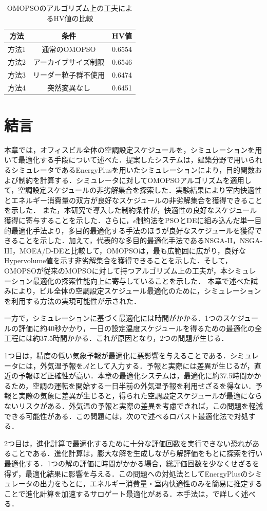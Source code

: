\begin{table}[ht]
  {\small
    \begin{center}
      \caption{OMOPSOのアルゴリズム上の工夫によるHV値の比較}
      \label{tab::sim_result_omopso_hv}
      \begin{tabular}{c|c|c}
        \hline
        方法  & 条件                 & HV値   \\
        \hline \hline
        方法1 & 通常のOMOPSO         & 0.6554 \\
        方法2 & アーカイブサイズ制限 & 0.6546 \\
        方法3 & リーダー粒子群不使用 & 0.6474 \\
        方法4 & 突然変異なし         & 0.6451 \\
        \hline
      \end{tabular}
    \end{center}
  }
\end{table}


\section{結言}
本章では，オフィスビル全体の空調設定スケジュールを，シミュレーションを用いて最適化する手段について述べた．提案したシステムは，建築分野で用いられるシミュレータであるEnergyPlusを用いたシミュレーションにより，目的関数および制約を計算する．シミュレータに対してOMOPSOアルゴリズムを適用して，空調設定スケジュールの非劣解集合を探索した．実験結果により室内快適性とエネルギー消費量の双方が良好なスケジュールの非劣解集合を獲得できることを示した．
また，本研究で導入した制約条件が，快適性の良好なスケジュール獲得に寄与することを示した．さらに，$\epsilon$制約法をPSOとDEに組み込んだ単一目的最適化手法より，多目的最適化する手法のほうが良好なスケジュールを獲得できることを示した．加えて，代表的な多目的最適化手法であるNSGA-II，NSGA-III，MOEA/D-DEと比較して，OMOPSOは，最も広範囲に広がり，良好なHypervolume値を示す非劣解集合を獲得できることを示した．そして，OMOPSOが従来のMOPSOに対して持つアルゴリズム上の工夫が，本シミュレーション最適化の探索性能向上に寄与していることを示した．
本章で述べた試みにより，ビル全体の空調設定スケジュール最適化のために，シミュレーションを利用する方法の実現可能性が示された．

一方で，シミュレーションに基づく最適化には時間がかかる．1つのスケジュールの評価に約40秒かかり，一日の設定温度スケジュールを得るための最適化の全工程には約37.5時間かかる．これが原因となり，2つの問題が生じる．

1つ目は，精度の低い気象予報が最適化に悪影響を与えることである．シミュレータには，外気温予報を$\mathcal{A}$として入力する．予報と実際には差異が生じるが，直近の予報ほど正確性が高い\cite{JMA19}．本章の最適化システムは，最適化に約37.5時間かかるため，空調の運転を開始する一日半前の外気温予報を利用せざるを得ない．予報と実際の気象に差異が生じると，得られた空調設定スケジュールが最適にならないリスクがある．外気温の予報と実際の差異を考慮できれば，この問題を軽減できる可能性がある．この問題には，次ので述べるロバスト最適化法で対処する．

2つ目は，進化計算で最適化するために十分な評価回数を実行できない恐れがあることである．進化計算は，膨大な解を生成しながら解評価をもとに探索を行い最適化する．1つの解の評価に時間がかかる場合，総評価回数を少なくせざるを得ず，最適化結果に影響を与える．この問題への対処法としてEnergyPlusのシミュレータの出力をもとに，エネルギー消費量・室内快適性のみを簡易に推定することで進化計算を加速するサロゲート最適化がある．本手法は，で詳しく述べる．
